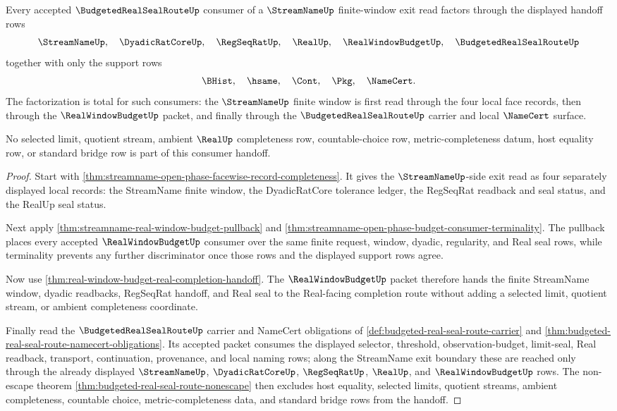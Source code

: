 \begin{theorem}
\label{thm:streamname-budgeted-real-window-handoff-totality}
Every accepted $\BudgetedRealSealRouteUp$ consumer of a $\StreamNameUp$ finite-window exit read factors through the displayed handoff rows
$$
\StreamNameUp,\quad \DyadicRatCoreUp,\quad \RegSeqRatUp,\quad \RealUp,\quad \RealWindowBudgetUp,\quad \BudgetedRealSealRouteUp
$$
together with only the support rows
$$
\BHist,\quad \hsame,\quad \Cont,\quad \Pkg,\quad \NameCert.
$$
The factorization is total for such consumers: the $\StreamNameUp$ finite window is first read through the four local face records, then through the $\RealWindowBudgetUp$ packet, and finally through the $\BudgetedRealSealRouteUp$ carrier and local $\NameCert$ surface.

No selected limit, quotient stream, ambient $\RealUp$ completeness row, countable-choice row, metric-completeness datum, host equality row, or standard bridge row is part of this consumer handoff.
\end{theorem}
\begin{proof}
Start with \autoref{thm:streamname-open-phase-facewise-record-completeness}. It gives the $\StreamNameUp$-side exit read as four separately displayed local records: the StreamName finite window, the DyadicRatCore tolerance ledger, the RegSeqRat readback and seal status, and the RealUp seal status.

Next apply \autoref{thm:streamname-real-window-budget-pullback} and \autoref{thm:streamname-open-phase-budget-consumer-terminality}. The pullback places every accepted $\RealWindowBudgetUp$ consumer over the same finite request, window, dyadic, regularity, and Real seal rows, while terminality prevents any further discriminator once those rows and the displayed support rows agree.

Now use \autoref{thm:real-window-budget-real-completion-handoff}. The $\RealWindowBudgetUp$ packet therefore hands the finite StreamName window, dyadic readbacks, RegSeqRat handoff, and Real seal to the Real-facing completion route without adding a selected limit, quotient stream, or ambient completeness coordinate.

Finally read the $\BudgetedRealSealRouteUp$ carrier and NameCert obligations of \autoref{def:budgeted-real-seal-route-carrier} and \autoref{thm:budgeted-real-seal-route-namecert-obligations}. Its accepted packet consumes the displayed selector, threshold, observation-budget, limit-seal, Real readback, transport, continuation, provenance, and local naming rows; along the StreamName exit boundary these are reached only through the already displayed $\StreamNameUp$, $\DyadicRatCoreUp$, $\RegSeqRatUp$, $\RealUp$, and $\RealWindowBudgetUp$ rows. The non-escape theorem \autoref{thm:budgeted-real-seal-route-nonescape} then excludes host equality, selected limits, quotient streams, ambient completeness, countable choice, metric-completeness data, and standard bridge rows from the handoff.
\end{proof}

